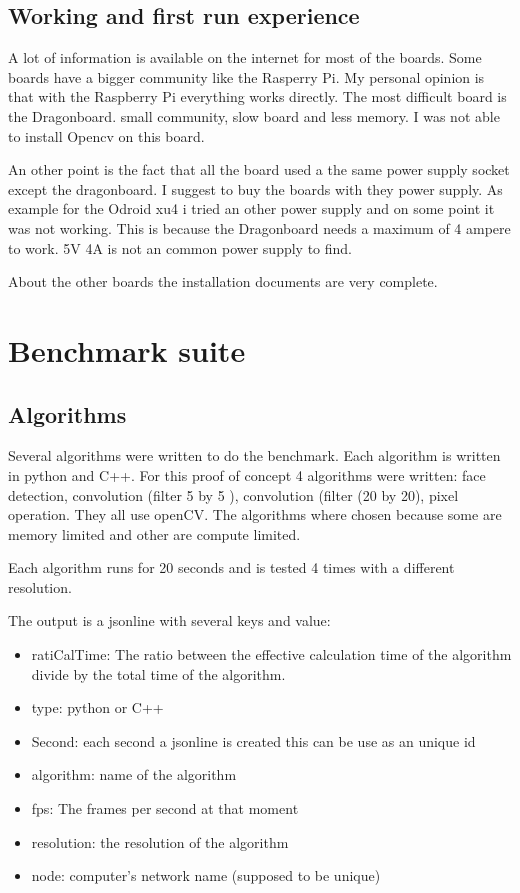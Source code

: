 \documentclass[english]{book_template} %
\begin{document}
\section{Working and first run experience}

A lot of information is available on the internet for most of the boards. Some boards have a bigger community like the Rasperry Pi.
My personal opinion is that with the Raspberry Pi everything works directly. The most difficult board is the Dragonboard. small community, slow board and less memory. I was not able to install Opencv on this board.

An other point is the fact that all the board used a the same power supply socket except the dragonboard. I suggest to buy the boards with they power supply. As example for the Odroid xu4 i tried an other power supply and on some point it was not working. This is because the Dragonboard needs a maximum of 4 ampere to work. 5V 4A is not an common power supply to find.

About the other boards the installation documents are very complete. 

 
\chapter{Benchmark suite}





  

\section{Algorithms}
Several algorithms were written to do the benchmark. Each algorithm is written in python and C++. For this proof of concept 4 algorithms were written: face detection,  convolution (filter 5 by 5 ), convolution (filter (20 by 20), pixel operation. They all use openCV. The algorithms where chosen because some are memory limited and other are compute limited. 

Each algorithm runs for 20 seconds and is tested 4 times with a different resolution. 

The output is a jsonline with several keys and value:
\begin{itemize}
\item ratiCalTime: The ratio between the effective calculation time of the algorithm divide by the total time of the algorithm.
\item type: python or C++
\item Second: each second a jsonline is created this can be use as an unique id
\item algorithm: name of the algorithm
\item fps: The frames per second at that moment
\item resolution: the resolution of the algorithm
\item node: computer’s network name (supposed to be unique)
\end{itemize}
\end{document}
